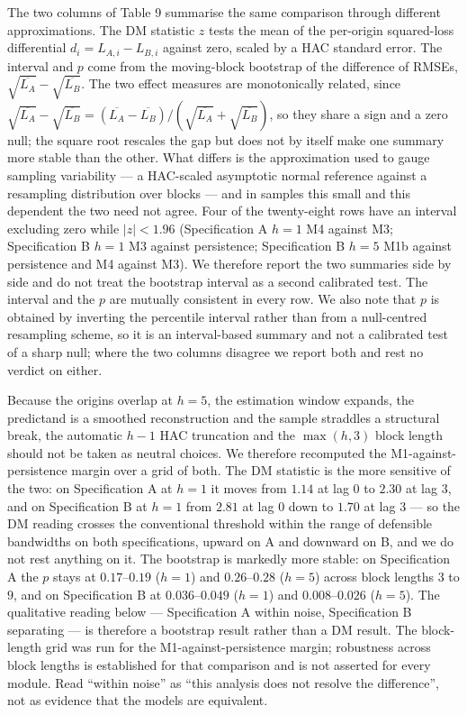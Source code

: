 \documentclass[11pt]{article}
\begin{document}
The two columns of Table 9 summarise the same comparison through
different approximations. The DM statistic \(z\) tests the mean of the
per-origin squared-loss differential \(d_i = L_{A,i} - L_{B,i}\) against
zero, scaled by a HAC standard error. The interval and \(p\) come from
the moving-block bootstrap of the difference of RMSEs,
\(\sqrt{\overline{L_A}} - \sqrt{\overline{L_B}}\). The two effect
measures are monotonically related, since
\(\sqrt{\overline{L_A}}-\sqrt{\overline{L_B}} =
(\overline{L_A}-\overline{L_B})/(\sqrt{\overline{L_A}}+
\sqrt{\overline{L_B}})\), so they share a sign and a zero null; the
square root rescales the gap but does not by itself make one summary
more stable than the other. What differs is the approximation used to
gauge sampling variability --- a HAC-scaled asymptotic normal reference
against a resampling distribution over blocks --- and in samples this
small and this dependent the two need not agree. Four of the
twenty-eight rows have an interval excluding zero while \(|z| < 1.96\)
(Specification A \(h=1\) M4 against M3; Specification B \(h=1\) M3
against persistence; Specification B \(h=5\) M1b against persistence
and M4 against M3). We therefore report the two summaries side by side
and do not treat the bootstrap interval as a second calibrated test. The interval and the \(p\) are mutually
consistent in every row. We also note that \(p\) is obtained by
inverting the percentile interval rather than from a null-centred
resampling scheme, so it is an interval-based summary and not a
calibrated test of a sharp null; where the two columns disagree we
report both and rest no verdict on either.

Because the origins overlap at \(h=5\), the estimation window expands,
the predictand is a smoothed reconstruction and the sample straddles a
structural break, the automatic \(h-1\) HAC truncation and the
\(\max(h,3)\) block length should not be taken as neutral choices. We
therefore recomputed the M1-against-persistence margin over a grid of
both. The DM statistic is the more sensitive of the two: on
Specification A at \(h=1\) it moves from \(1.14\) at lag \(0\) to
\(2.30\) at lag \(3\), and on Specification B at \(h=1\) from
\(2.81\) at lag \(0\) down to \(1.70\) at lag \(3\) --- so the DM
reading crosses the conventional threshold within the range of
defensible bandwidths on both specifications, upward on A and downward
on B, and we do not rest anything on it.
The bootstrap is markedly more stable: on Specification A the \(p\)
stays at \(0.17\)--\(0.19\) (\(h=1\)) and \(0.26\)--\(0.28\)
(\(h=5\)) across block lengths \(3\) to \(9\), and on Specification B
at \(0.036\)--\(0.049\) (\(h=1\)) and \(0.008\)--\(0.026\)
(\(h=5\)). The qualitative reading below --- Specification A within noise,
Specification B separating --- is therefore a bootstrap result rather
than a DM result. The block-length grid was run for the
M1-against-persistence margin; robustness across block lengths is
established for that comparison and is not asserted for every module. Read
``within noise'' as ``this analysis does not resolve the difference'',
not as evidence that the models are equivalent.
\end{document}
